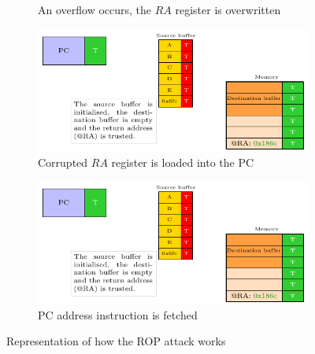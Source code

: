 \begin{figure}[ht]
\begin{subfigure}[b]{0.49\textwidth}
        \caption{An overflow occurs, the $RA$ register is overwritten}
        \label{fig:rop_attack_3}
    \end{subfigure}
    \hfill
    \begin{subfigure}[b]{0.49\textwidth}
        \includegraphics[width=\textwidth, page=4]{c3_vulnerabilities_assessment/img/buffer_overflow/schemaPedagogique.pdf}
        \caption{Corrupted $RA$ register is loaded into the PC}
        \label{fig:rop_attack_4}
    \end{subfigure}
    \hfill
    \begin{subfigure}[b]{0.49\textwidth}
        \includegraphics[width=\textwidth, page=5]{c3_vulnerabilities_assessment/img/buffer_overflow/schemaPedagogique.pdf}
        \caption{PC address instruction is fetched}
        \label{fig:rop_attack_5}
    \end{subfigure}
    \caption{Representation of how the ROP attack works}
    \label{fig:rop_attack}
\end{figure}

